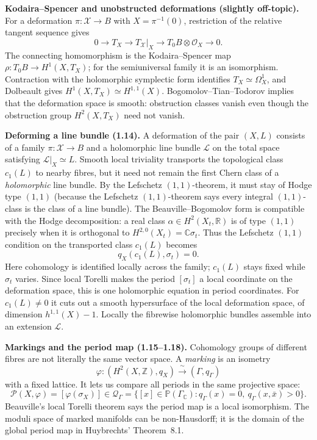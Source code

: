 \documentclass[11pt]{article}
\begin{document}
\par\smallskip\noindent
\textbf{Kodaira--Spencer and unobstructed deformations (slightly off-topic).}
For a deformation $\pi:\mathcal X\to B$ with
$X=\pi^{-1}(0)$, restriction of the relative
tangent sequence gives
\[
0\to T_X\to T_{\mathcal X}|_X
\to T_0B\otimes\mathcal O_X\to0.
\]
The connecting homomorphism is the
Kodaira--Spencer map
$\rho:T_0B\to H^1(X,T_X)$; for the
semiuniversal family it is an isomorphism.
Contraction with the holomorphic symplectic
form identifies $T_X\simeq\Omega_X^1$,
and Dolbeault gives
$H^1(X,T_X)\simeq H^{1,1}(X)$.
Bogomolov--Tian--Todorov implies that
the deformation space is smooth: obstruction
classes vanish even though the obstruction
group $H^2(X,T_X)$ need not vanish.

\par\smallskip\noindent
\textbf{Deforming a line bundle (1.14).}
A deformation of the pair $(X,L)$ consists
of a family $\pi:\mathcal X\to B$ and a
holomorphic line bundle $\mathcal L$ on
the total space satisfying
$\mathcal L|_X\simeq L$.
Smooth local triviality transports
the topological class $c_1(L)$ to nearby
fibres, but it need not remain the first
Chern class of a \emph{holomorphic} line
bundle. By the Lefschetz $(1,1)$-theorem,
it must stay of Hodge type $(1,1)$
(because the Lefschetz $(1,1)$-theorem says
every integral $(1,1)$-class is the class
of a line bundle).
The Beauville--Bogomolov form is compatible
with the Hodge decomposition: a real class
$\alpha\in H^2(X_t,\mathbb R)$ is of type
$(1,1)$ precisely when it is orthogonal
to $H^{2,0}(X_t)=\mathbb C\sigma_t$.
Thus the Lefschetz $(1,1)$ condition on
the transported class $c_1(L)$ becomes
\[
q_X(c_1(L),\sigma_t)=0.
\]
Here cohomology is identified locally across
the family; $c_1(L)$ stays fixed while
$\sigma_t$ varies. Since local Torelli makes
the period $[\sigma_t]$ a local coordinate
on the deformation space, this is one
holomorphic equation in period coordinates.
For $c_1(L)\ne0$ it cuts out a smooth
hypersurface of the local deformation space,
of dimension $h^{1,1}(X)-1$.
Locally the fibrewise holomorphic bundles
assemble into an extension $\mathcal L$.

\par\smallskip\noindent
\textbf{Markings and the period map (1.15--1.18).}
Cohomology groups of different fibres are
not literally the same vector space.
A \emph{marking} is an isometry
\[
\varphi:(H^2(X,\mathbb Z),q_X)
\xrightarrow{\ \sim\ }(\Gamma,q_\Gamma)
\]
with a fixed lattice. It lets us compare
all periods in the same projective space:
\[
\mathcal P(X,\varphi)
=[\varphi(\sigma_X)]\in
\mathcal Q_\Gamma
=\{[x]\in\mathbb P(\Gamma_\mathbb C):
q_\Gamma(x)=0,\ q_\Gamma(x,\bar x)>0\}.
\]
Beauville's local Torelli theorem says
the period map is a local isomorphism.
The moduli space of marked manifolds
can be non-Hausdorff; it is the domain
of the global period map in
Huybrechts' Theorem~8.1.
\end{document}

